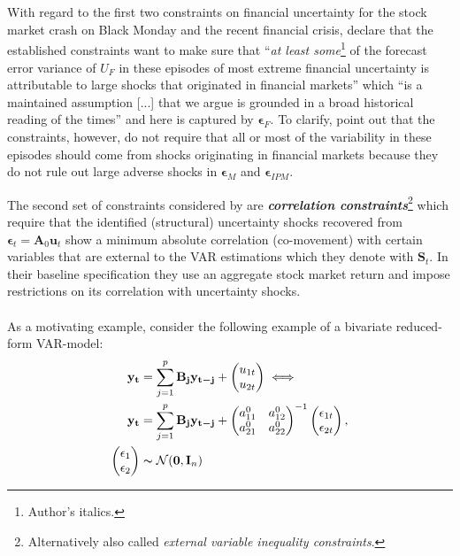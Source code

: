 \documentclass[a4paper,11pt,listof=nochaptergap,oneside,pointednumbers,bibtotoc,bigheadings,liststotoc,hidelinks]{scrbook}
\theoremstyle{mysatz}
\theoremstyle{mydefinition}
\theoremstyle{mytheorem}
\theoremstyle{mybemerkung}
\newcommand{\vect}[1]{\boldsymbol{\mathbf{#1}}}
\begin{document}
\\
\\
With regard to the first two constraints on financial uncertainty for the stock market crash on Black Monday and the recent financial crisis, \citet{ludvigsonetal:18} declare that the established constraints want to make sure that ``\textit{at least some}\footnote{Author's italics.} of the forecast error variance of $U_F$ in these episodes of most extreme financial uncertainty is attributable to large shocks that originated in financial markets'' which ``is a maintained assumption [...] that we argue is grounded in a broad historical reading of the times'' \citep[p. 8]{ludvigsonetal:18} and here is captured by $\vect{\epsilon}_F$. To clarify, \citet{ludvigsonetal:18} point out that the constraints, however, do not require that all or most of the variability in these episodes should come from shocks originating in financial markets because they do not rule out large adverse shocks in $\vect{\epsilon}_M$ and $\vect{\epsilon}_{IPM}$. 




The second set of constraints considered by \citet{ludvigsonetal:18} are \textbf{\textit{correlation constraints}}\footnote{Alternatively also called \textit{external variable inequality constraints}.} which require that the identified (structural) uncertainty shocks recovered from $\vect{\epsilon}_t = \vect{A}_0\vect{u}_t$ show a minimum absolute correlation (co-movement) with certain variables that are external to the VAR estimations which they denote with $\vect{S}_t$. In their baseline specification they use an aggregate stock market return and impose restrictions on its correlation with uncertainty shocks. \\
\\
As a motivating example, \citet{ludvigsonetal:17} consider the following example of a bivariate reduced-form VAR-model:
\begin{equation} \label{eq:svar_ludvi12_a}
\begin{split}
	\vect{y_t} & = \sum_{j=1}^{p} \vect{B_j}\vect{y_{t-j}} + 
		\begin{pmatrix}
			u_{1t} \\
			u_{2t}
		\end{pmatrix} \iff \\
\vect{y_t} & = \sum_{j=1}^{p} \vect{B_j}\vect{y_{t-j}} + 	
					\begin{pmatrix}
    			a_{11}^0 &  a_{12}^0 \\
			a_{21}^0 &  a_{22}^0
 			\end{pmatrix}^{-1}
		\begin{pmatrix}
			\epsilon_{1t} \\
			\epsilon_{2t}
		\end{pmatrix},\\
		\begin{pmatrix}
			\epsilon_1 \\
			\epsilon_2
		\end{pmatrix} & \thicksim \mathcal{N}(\vect{0}, \vect{I}_n)
\end{split}								
\end{equation}
\end{document}
